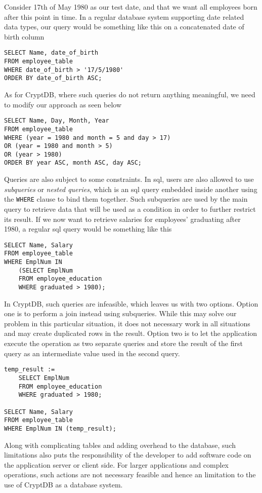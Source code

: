 Consider 17th of May 1980 as our test date, and that we want all employees born after this point in time. In a regular database system supporting date related data types, our query would be something like this on a concatenated date of birth column

\begin{verbatim}
SELECT Name, date_of_birth
FROM employee_table
WHERE date_of_birth > '17/5/1980'
ORDER BY date_of_birth ASC;
\end{verbatim}

As for CryptDB, where such queries do not return anything meaningful, we need to modify our approach as seen below

\begin{verbatim}
SELECT Name, Day, Month, Year
FROM employee_table
WHERE (year = 1980 and month = 5 and day > 17)
OR (year = 1980 and month > 5)
OR (year > 1980)
ORDER BY year ASC, month ASC, day ASC;
\end{verbatim}

Queries are also subject to some constraints. In \gls{sql}, users are also allowed to use \emph{subqueries} or \emph{nested queries}, which is an \gls{sql} query embedded inside another using the \verb!WHERE! clause to bind them together. Such subqueries are used by the main query to retrieve data that will be used as a condition in order to further restrict its result. If we now want to retrieve salaries for employees' graduating after 1980, a regular \gls{sql} query would be something like this

\begin{verbatim}
SELECT Name, Salary
FROM employee_table
WHERE EmplNum IN
    (SELECT EmplNum
    FROM employee_education
    WHERE graduated > 1980);
\end{verbatim}

In CryptDB, such queries are infeasible, which leaves us with two options. Option one is to perform a join instead using subqueries. While this may solve our problem in this particular situation, it does not necessary work in all situations and may create duplicated rows in the result. Option two is to let the application execute the operation as two separate queries and store the result of the first query as an intermediate value used in the second query.

\begin{verbatim}
temp_result :=
    SELECT EmplNum
    FROM employee_education
    WHERE graduated > 1980;

SELECT Name, Salary
FROM employee_table 
WHERE EmplNum IN (temp_result);
\end{verbatim}


Along with complicating tables and adding overhead to the database, such limitations also puts the responsibility of the developer to add software code on the application server or client side. For larger applications and complex operations, such actions are not necessary feasible and hence an limitation to the use of CryptDB as a database system.\\